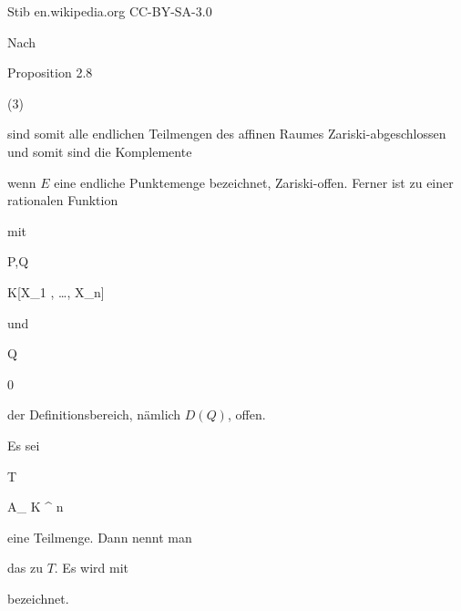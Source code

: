  {} {Stib} {en.wikipedia.org} {CC-BY-SA-3.0} {}


Nach

Proposition 2.8

 (3)

sind somit alle endlichen Teilmengen des affinen Raumes Zariski-abgeschlossen und somit sind die Komplemente


 wenn $E$ eine endliche Punktemenge bezeichnet, Zariski-offen. Ferner ist zu einer rationalen Funktion


 mit


\mavergleichskette


{\vergleichskette


{ P,Q
}


{ \in }{ K[X_1 , \ldots , X_n]
}


{  }{
}


{    }{
}


{   }{
}


}
{}{}{}
und


\mavergleichskette


{\vergleichskette


{ Q
}


{ \neq }{ 0
}


{  }{
}


{    }{
}


{   }{
}


}
{}{}{}
der Definitionsbereich, nämlich $D(Q)$, offen.






{}


{


Es sei


\mavergleichskette


{\vergleichskette


{T
}


{ \subseteq }{ { {\mathbb A}_{  K }^{  n   } }
}


{  }{
}


{    }{
}


{   }{
}


}
{}{}{}
eine Teilmenge. Dann nennt man


 {  }


das  zu $T$. Es wird mit


 bezeichnet.


}


